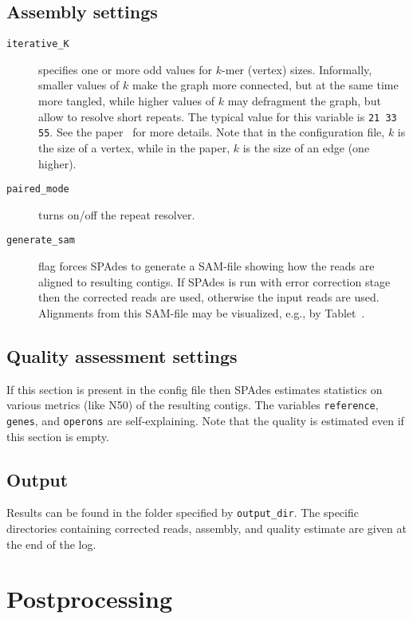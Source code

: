 \documentclass{article}
\def\spades{SPAdes}
\begin{document}
\subsection{Assembly settings}\label{subsec:assembly}
\begin{description}
\item[{\tt iterative\_K}] specifies one or more odd values for $k$-mer (vertex) sizes.  Informally, smaller values of $k$ make the graph more connected, but at the same time more tangled, while higher values of $k$ may defragment the graph, but allow to resolve short repeats. The typical value for this variable is {\tt 21 33 55}. See the paper~\cite{main} for more details.  Note that in the configuration file, $k$ is the size of a vertex, while in the paper, $k$ is the size of an edge (one higher).

\item[{\tt paired\_mode}] turns on/off the repeat resolver.

\item[{\tt generate\_sam}] flag forces {\spades} to generate a SAM-file
showing how the reads are aligned to resulting contigs. If {\spades}
is run with error correction stage then the corrected reads are used,
otherwise the input reads are used. Alignments from this SAM-file
may be visualized, e.g., by Tablet~\cite{tablet}.
\end{description}

\subsection{Quality assessment settings}
If this section is present in the config file then
{\spades} estimates statistics on various metrics (like N50) of the resulting contigs.
The variables {\tt reference}, {\tt genes}, and {\tt operons} are self-explaining.
Note that the quality is estimated even if this section is empty.

\subsection{Output}
Results can be found in the folder specified by {\tt output\_dir}.
The specific directories containing corrected reads, assembly, and quality estimate are given
at the end of the log.

\section{Postprocessing}
\end{document}
